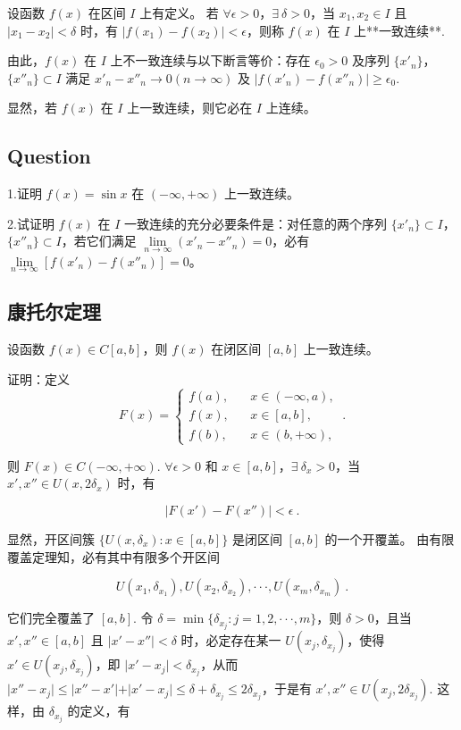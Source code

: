   设函数 $f(x)$ 在区间 $I$ 上有定义。  若 $\forall \epsilon>0$，$\exists\ \delta>0$，当 $x_1,x_2\in I$ 且 $\vert x_1-x_2\vert<\delta$ 时，有 $\vert f(x_1)-f(x_2)\vert<\epsilon$，则称 $f(x)$ 在 $I$ 上**一致连续**. 

  由此，$f(x)$ 在 $I$ 上不一致连续与以下断言等价：存在 $\epsilon_0>0$ 及序列 $\{x'_n\}$，$\{x''_n\}\subset I$ 满足 $x'_n-x''_n\rightarrow0(n\rightarrow\infty)$ 及 $\vert f(x'_n)-f(x''_n)\vert\geq\epsilon_0$.

  显然，若 $f(x)$ 在 $I$ 上一致连续，则它必在 $I$ 上连续。

\subsection{Question}

1.证明 $f(x)=\sin x$ 在 $(-\infty,+\infty)$ 上一致连续。

2.试证明 $f(x)$ 在 $I$ 一致连续的充分必要条件是：对任意的两个序列 $\{x'_n\}\subset I$，$\{x''_n\}\subset I$，若它们满足 $\lim\limits_{n\rightarrow\infty}(x'_n-x''_n)=0$，必有 $\lim\limits_{n\rightarrow\infty}[f(x'_n)-f(x''_n)]=0$。

\subsection{康托尔定理}\label{sub_conff_1}

设函数 $f(x)\in C[a,b]$，则 $f(x)$ 在闭区间 $[a,b]$ 上一致连续。

证明：定义
$$
F(x)=\left\{
\begin{matrix}
f(a),\ \ \ \ &x\in(-\infty,a),\\
f(x),\ \ \ \ &x\in[a,b],\\
f(b),\ \ \ \ &x\in(b,+\infty),
\end{matrix}
\right.~.
$$

则 $F(x)\in C(-\infty,+\infty)$. $\forall \epsilon>0$ 和 $x\in[a,b]$，$\exists\ \delta_x>0$，当 $x',x''\in U(x,2\delta_x)$ 时，有

$$
\vert F(x')-F(x'')\vert<\epsilon~.
$$

显然，开区间簇 $\{U(x,\delta_x):x\in[a,b]\}$ 是闭区间 $[a,b]$ 的一个开覆盖。 由有限覆盖定理知，必有其中有限多个开区间

$$
U(x_1,\delta_{x_1}),U(x_2,\delta_{x_2}),\cdot\cdot\cdot,U(x_m,\delta_{x_m})~.
$$

它们完全覆盖了 $[a,b]$. 令 $\delta=\min\{\delta_{x_j}:j=1,2,\cdot\cdot\cdot,m\}$，则 $\delta>0$，且当 $x',x''\in[a,b]$ 且 $\vert x'-x''\vert<\delta$ 时，必定存在某一 $U(x_j,\delta_{x_j})$，使得 $x'\in U(x_j,\delta_{x_j})$，即 $\vert x'-x_j\vert<\delta_{x_j}$，从而 $\vert x''-x_j\vert\leq\vert x''-x'\vert+\vert x'-x_j\vert\leq\delta+\delta_{x_j}\leq2\delta_{x_j}$，于是有 $x',x''\in U(x_j,2\delta_{x_j})$. 这样，由 $\delta_{x_j}$ 的定义，有

